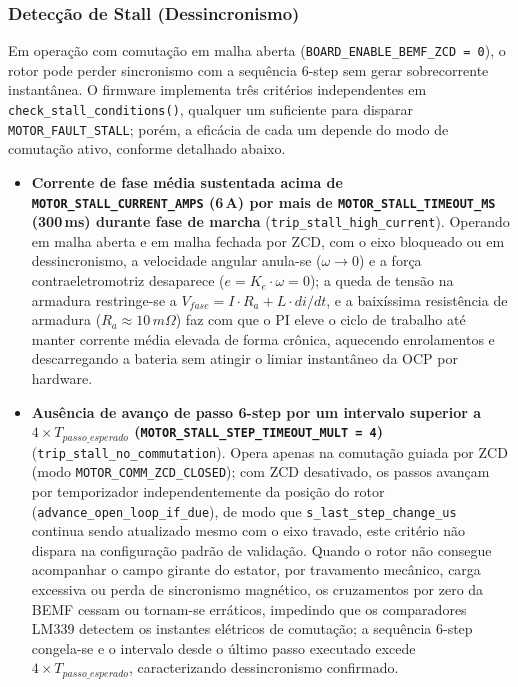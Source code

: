 \subsubsection{Detecção de Stall (Dessincronismo)}

Em operação com comutação em malha aberta (\texttt{BOARD\_ENABLE\_BEMF\_ZCD\,=\,0}), o rotor pode perder sincronismo com a sequência 6-step sem gerar sobrecorrente instantânea. O firmware implementa três critérios independentes em \texttt{check\_stall\_conditions()}, qualquer um suficiente para disparar \texttt{MOTOR\_FAULT\_STALL}; porém, a eficácia de cada um depende do modo de comutação ativo, conforme detalhado abaixo.

\begin{itemize}
    \item \textbf{Corrente de fase média sustentada acima de \texttt{MOTOR\_STALL\_CURRENT\_AMPS} (6\,A) por mais de \texttt{MOTOR\_STALL\_TIMEOUT\_MS} (300\,ms) durante fase de marcha} (\texttt{trip\_stall\_high\_current}). Operando em malha aberta e em malha fechada por ZCD, com o eixo bloqueado ou em dessincronismo, a velocidade angular anula-se ($\omega \to 0$) e a força contraeletromotriz desaparece ($e = K_e \cdot \omega = 0$); a queda de tensão na armadura restringe-se a $V_{fase} = I \cdot R_a + L \cdot di/dt$, e a baixíssima resistência de armadura ($R_a \approx 10\,m\Omega$) faz com que o PI eleve o ciclo de trabalho até manter corrente média elevada de forma crônica, aquecendo enrolamentos e descarregando a bateria sem atingir o limiar instantâneo da OCP por hardware.

    \item \textbf{Ausência de avanço de passo 6-step por um intervalo superior a $4 \times T_{passo\_esperado}$ (\texttt{MOTOR\_STALL\_STEP\_TIMEOUT\_MULT\,=\,4})} (\texttt{trip\_stall\_no\_commutation}).
    Opera apenas na comutação guiada por ZCD (modo \texttt{MOTOR\_COMM\_ZCD\_CLOSED}); com ZCD desativado, os passos avançam por temporizador independentemente da posição do rotor (\texttt{advance\_open\_loop\_if\_due}), de modo que \texttt{s\_last\_step\_change\_us} continua sendo atualizado mesmo com o eixo travado, este critério não dispara na configuração padrão de validação. Quando o rotor não consegue acompanhar o campo girante do estator, por travamento mecânico, carga excessiva ou perda de sincronismo magnético, os cruzamentos por zero da BEMF cessam ou tornam-se erráticos, impedindo que os comparadores LM339 detectem os instantes elétricos de comutação; a sequência 6-step congela-se e o intervalo desde o último passo executado excede $4 \times T_{passo\_esperado}$, caracterizando dessincronismo confirmado.


\end{itemize}

